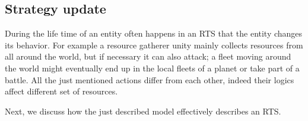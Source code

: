 \subsection*{Strategy update}
During the life time of an entity often happens in an RTS that the entity changes its behavior. For example a resource gatherer unity mainly collects resources from all around the world, but if necessary it can also attack; a fleet moving around the world might eventually end up in the local fleets of a planet or take part of a battle. All the just mentioned actions differ from each other, indeed their logics affect different set of resources.

Next, we discuss how the just described model effectively describes an RTS. 